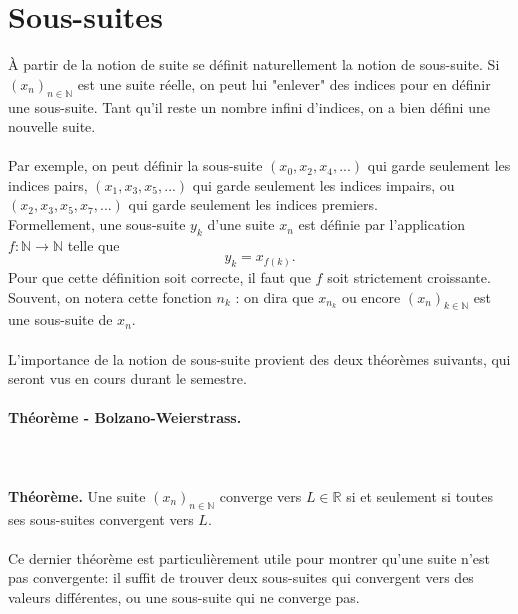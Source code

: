 \documentclass[oneside,11pt,french,table]{book}
\theoremstyle{definition}
\theoremstyle{plain}
\theoremstyle{remark}
\begin{document}
\section{Sous-suites}
À partir de la notion de suite se définit naturellement la notion de sous-suite. Si $(x_n)_{n \in \mathbb{N}}$ est une suite réelle, on peut lui "enlever" des indices pour en définir une sous-suite. Tant qu'il reste un nombre infini d'indices, on a bien défini une nouvelle suite. \\ \\
Par exemple, on peut définir la sous-suite $(x_0,x_2,x_4,...)$ qui garde seulement les indices pairs, $(x_1,x_3,x_5,...)$ qui garde seulement les indices impairs, ou $(x_2,x_3,x_5,x_7,...)$ qui garde seulement les indices premiers. \\
Formellement, une sous-suite $y_k$ d'une suite $x_n$ est définie par l'application $f: \mathbb{N} \longrightarrow \mathbb{N}$ telle que $$y_k = x_{f(k)}.$$ Pour que cette définition soit correcte, il faut que $f$ soit strictement croissante. Souvent, on notera cette fonction $n_k$ : on dira que $x_{n_k}$ ou encore $(x_n)_{k\in \mathbb{N}}$ est une sous-suite de $x_n$. \\ \\
L'importance de la notion de sous-suite provient des deux théorèmes suivants, qui seront vus en cours durant le semestre. \paragraph{Théorème - Bolzano-Weierstrass.}
\paragraph{}
\\
\paragraph{}
\textbf{Théorème.} Une suite $(x_n)_{n \in \mathbb{N}}$ converge vers $L \in \mathbb{R}$ si et seulement si toutes ses sous-suites convergent vers $L$. \\
\\
Ce dernier théorème est particulièrement utile pour montrer qu'une suite n'est pas convergente: il suffit de trouver deux sous-suites qui convergent vers des valeurs différentes, ou une sous-suite qui ne converge pas.
\end{document}
